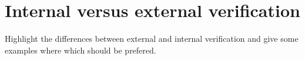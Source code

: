 \section{Internal versus external verification}
Highlight the differences between external and internal verification and give some examples where which should be prefered.
